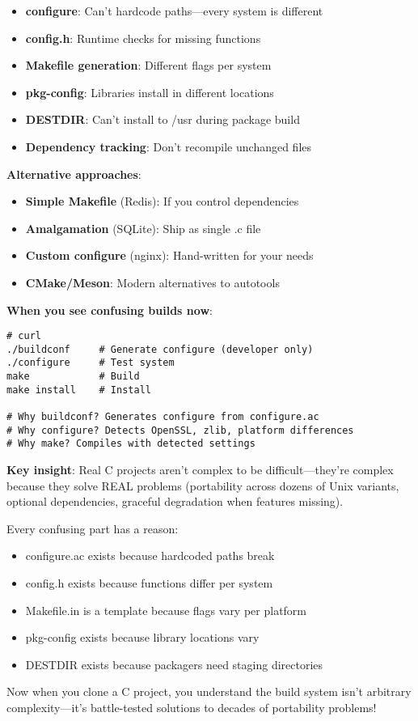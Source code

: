 \begin{itemize}
    \item \textbf{configure}: Can't hardcode paths---every system is different
    \item \textbf{config.h}: Runtime checks for missing functions
    \item \textbf{Makefile generation}: Different flags per system
    \item \textbf{pkg-config}: Libraries install in different locations
    \item \textbf{DESTDIR}: Can't install to /usr during package build
    \item \textbf{Dependency tracking}: Don't recompile unchanged files
\end{itemize}

\textbf{Alternative approaches}:

\begin{itemize}
    \item \textbf{Simple Makefile} (Redis): If you control dependencies
    \item \textbf{Amalgamation} (SQLite): Ship as single .c file
    \item \textbf{Custom configure} (nginx): Hand-written for your needs
    \item \textbf{CMake/Meson}: Modern alternatives to autotools
\end{itemize}

\textbf{When you see confusing builds now}:

\begin{lstlisting}
# curl
./buildconf     # Generate configure (developer only)
./configure     # Test system
make            # Build
make install    # Install

# Why buildconf? Generates configure from configure.ac
# Why configure? Detects OpenSSL, zlib, platform differences
# Why make? Compiles with detected settings
\end{lstlisting}

\textbf{Key insight}: Real C projects aren't complex to be difficult---they're complex because they solve REAL problems (portability across dozens of Unix variants, optional dependencies, graceful degradation when features missing).

Every confusing part has a reason:
\begin{itemize}
    \item configure.ac exists because hardcoded paths break
    \item config.h exists because functions differ per system
    \item Makefile.in is a template because flags vary per platform
    \item pkg-config exists because library locations vary
    \item DESTDIR exists because packagers need staging directories
\end{itemize}

Now when you clone a C project, you understand the build system isn't arbitrary complexity---it's battle-tested solutions to decades of portability problems!
